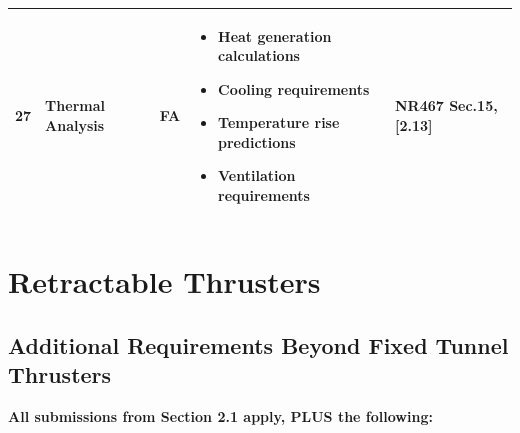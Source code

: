\documentclass[11pt,a4paper]{report}
\newcommand{\fa}{\textbf{\textcolor{warningred}{FA}}}
\begin{document}
\begin{longtable}{|p{0.5cm}|p{5cm}|p{1.5cm}|p{5.5cm}|p{2cm}|}
27 & Thermal Analysis & \fa{} & 
\begin{itemize}[leftmargin=*,nosep]
\item Heat generation calculations
\item Cooling requirements
\item Temperature rise predictions
\item Ventilation requirements
\end{itemize} & NR467 Sec.15, [2.13] \\
\hline

\end{longtable}

\newpage

\section{Retractable Thrusters}

\subsection{Additional Requirements Beyond Fixed Tunnel Thrusters}

\textbf{All submissions from Section 2.1 apply, PLUS the following:}
\end{document}
